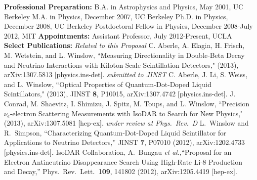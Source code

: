 


{\bf Professional Preparation:} 
\newline \noindent
B.A. in Astrophysics and Physics, May 2001, UC Berkeley
\newline \noindent
M.A. in Physics, December 2007, UC Berkeley
\newline \noindent
Ph.D. in Physics, December 2008, UC Berkeley
\newline \noindent
Postdoctoral Fellow in Physics, December 2008-July 2012, MIT
\newline\newline \noindent
{\bf Appointments:} 
\newline \noindent
Assistant Professor, July 2012-Present, UCLA
\newline\newline \noindent
{\bf Select  Publications:}
\newline\newline\noindent
{\it Related to this Proposal}
\newline\noindent
C. Aberle, A. Elagin, H. Frisch, M. Wetstein, and L. Winslow, ``Measuring Directionality in Double-Beta Decay and Neutrino Interactions with Kiloton-Scale Scintillation Detectors," (2013), arXiv:1307.5813 [physics.ins-det]. {\it submitted to JINST}
\newline\newline\noindent
C. Aberle, J. Li, S. Weiss, and L. Winslow, ``Optical Properties of Quantum-Dot-Doped Liquid Scintillators,"  (2013), JINST {\bf 8}, P10015, arXiv:1307.4742 [physics.ins-det].
\newline\newline \noindent
J. Conrad, M. Shaevitz, I. Shimizu, J. Spitz, M. Toups, and L. Winslow, ``Precision $\bar{\nu}_{e}$-electron Scattering Measurements with IsoDAR to Search for New Physics," (2013), arXiv:1307.5081 [hep-ex]. {\it under review at Phys.\ Rev.\ D}
\newline\newline \noindent
L.~Winslow and R.~Simpson, ``Characterizing Quantum-Dot-Doped Liquid Scintillator for Applications to Neutrino Detectors,'' JINST {\bf 7}, P07010 (2012), arXiv:1202.4733 [physics.ins-det].
\newline\newline \noindent
IsoDAR Collaboration, A.~Bungau {\it et al.},``Proposal for an Electron Antineutrino Disappearance Search Using High-Rate Li-8 Production and Decay,'' Phys.\ Rev.\ Lett.\  {\bf 109}, 141802 (2012),  arXiv:1205.4419 [hep-ex].
